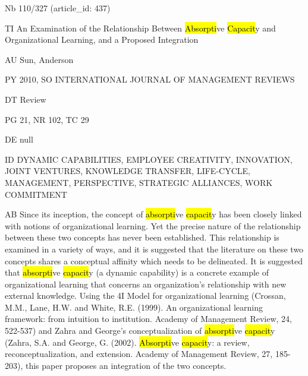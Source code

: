 \documentclass[a4paper]{article}
\begin{document}
\vspace*{-2cm}
Nb \tabto{0cm}110/327 (article\_id: 437)\par
TI \tabto{0cm}An Examination of the Relationship Between \hl{Absorpti}ve \hl{Capacit}y and Organizational Learning, and a Proposed Integration\par
AU \tabto{0cm}Sun, Anderson\par
PY \tabto{0cm}2010, SO INTERNATIONAL JOURNAL OF MANAGEMENT REVIEWS\par
DT \tabto{0cm}Review\par
PG \tabto{0cm}21, NR 102, TC 29\par
DE \tabto{0cm}null\par
ID \tabto{0cm}DYNAMIC CAPABILITIES, EMPLOYEE CREATIVITY, INNOVATION, JOINT VENTURES, KNOWLEDGE TRANSFER, LIFE-CYCLE, MANAGEMENT, PERSPECTIVE, STRATEGIC ALLIANCES, WORK COMMITMENT\par
AB \tabto{0cm}Since its inception, the concept of \hl{absorpti}ve \hl{capacit}y has been closely linked with notions of organizational learning. Yet the precise nature of the relationship between these two concepts has never been established. This relationship is examined in a variety of ways, and it is suggested that the literature on these two concepts shares a conceptual affinity which needs to be delineated. It is suggested that \hl{absorpti}ve \hl{capacit}y (a dynamic capability) is a concrete example of organizational learning that concerns an organization's relationship with new external knowledge. Using the 4I Model for organizational learning (Crossan, M.M., Lane, H.W. and White, R.E. (1999). An organizational learning framework: from intuition to institution. Academy of Management Review, 24, 522-537) and Zahra and George's conceptualization of \hl{absorpti}ve \hl{capacit}y (Zahra, S.A. and George, G. (2002). \hl{Absorpti}ve \hl{capacit}y: a review, reconceptualization, and extension. Academy of Management Review, 27, 185-203), this paper proposes an integration of the two concepts.\par
\clearpage
\end{document}
